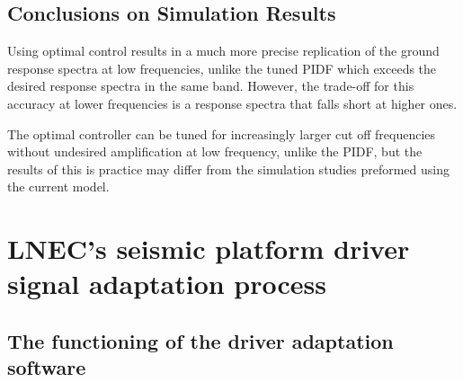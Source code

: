 \documentclass[10pt]{extarticle}
\begin{document}
\subsection{Conclusions on Simulation Results}
Using optimal control results in a much more precise replication of the ground response spectra at low frequencies, unlike the tuned PIDF which exceeds the desired response spectra in the same band. However, the trade-off for this accuracy at lower frequencies is a response spectra that falls short at higher ones. 

The optimal controller can be tuned for increasingly larger cut off frequencies without undesired amplification at low frequency, unlike the PIDF, but the results of this is practice may differ from the simulation studies preformed using the current model.

\section{LNEC's seismic platform driver signal adaptation process}

\subsection{The functioning of the driver adaptation software}
\end{document}
